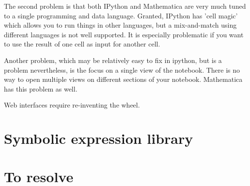 \documentclass[11pt]{article}
\begin{document}
The second problem is that both IPython and Mathematica are very much
tuned to a single programming and data language. Granted, IPython has
'cell magic' which allows you to run things in other languages, but a
mix-and-match using different languages is not well supported. It is
especially problematic if you want to use the result of one cell as
input for another cell.

Another problem, which may be relatively easy to fix in ipython, but
is a problem nevertheless, is the focus on a single view of the
notebook. There is no way to open multiple views on different sections
of your notebook. Mathematica has this problem as well.

Web interfaces require re-inventing the wheel.

% 

\section{Symbolic expression library}





% 
% 
% 
% 

\section{To resolve}
\end{document}

